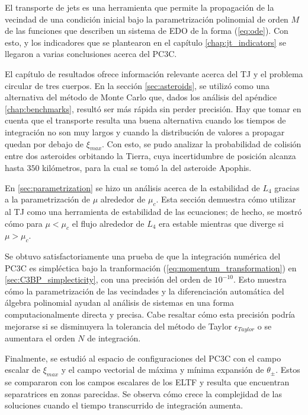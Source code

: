 El transporte de jets es una herramienta que permite la propagación de la vecindad de una condición inicial bajo la parametrización polinomial de orden $M$ de las funciones que describen un sistema de EDO de la forma (\ref{eq:ode}). Con esto, y los indicadores que se plantearon en el capítulo \ref{chap:jt_indicators} se llegaron a varias conclusiones acerca del PC3C.

El capítulo de resultados ofrece información relevante acerca del TJ y el problema circular de tres cuerpos. En la sección \ref{sec:asteroids}, se utilizó como una alternativa del método de Monte Carlo que, dados los análisis del apéndice \ref{chap:benchmarks}, resultó ser más rápida sin perder precisión. Hay que tomar en cuenta que el transporte resulta una buena alternativa cuando los tiempos de integración no son muy largos y cuando la distribución de valores a propagar quedan por debajo de $\xi_{max}$. Con esto, se pudo analizar la probabilidad de colisión entre dos asteroides orbitando la Tierra, cuya incertidumbre de posición alcanza hasta $350$ kilómetros, para la cual se tomó la del asteroide Apophis. 

En \ref{sec:parametrization} se hizo un análisis acerca de la estabilidad de $L_4$ gracias a la parametrización de $\mu$ alrededor de $\mu_c$. Esta sección demuestra cómo utilizar al TJ como una herramienta de estabilidad de las ecuaciones; de hecho, se mostró cómo para $\mu < \mu_c$ el flujo alrededor de $L_4$ era estable mientras que diverge si $\mu > \mu_c$. 

Se obtuvo satisfactoriamente una prueba de que la integración numérica del PC3C es simpléctica bajo la tranformación (\ref{eq:momentum_transformation}) en \ref{sec:C3BP_simplecticity}, con una precisión del orden de $10^{-10}$. Esto muestra cómo la parametrización de las vecindades y la diferenciación automática del álgebra polinomial ayudan al análisis de sistemas en una forma computacionalmente directa y precisa. Cabe resaltar cómo esta precisión podría mejorarse si se disminuyera la tolerancia del método de Taylor $\epsilon_{Taylor}$ o se aumentara el orden $N$ de integración.

Finalmente, se estudió al espacio de configuraciones del PC3C con el campo escalar de $\xi_{max}$ y el campo vectorial de máxima y mínima expansión de $\theta_{\pm}$. Estos se compararon con los campos escalares de los ELTF y resulta que encuentran separatrices en zonas parecidas. Se observa cómo crece la complejidad de las soluciones cuando el tiempo transcurrido de integración aumenta.

